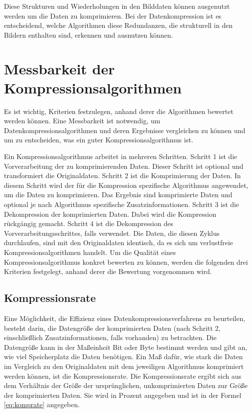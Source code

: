 \documentclass[conference]{IEEEtran}
\begin{document}
Diese Strukturen und Wiederholungen in den Bilddaten können ausgenutzt werden um die
Daten zu komprimieren.
Bei der Datenkompression ist es entscheidend, welche Algorithmen diese Redundanzen, 
die strukturell in den Bildern enthalten sind, erkennen und ausnutzen können.


\section{Messbarkeit der Kompressionsalgorithmen}

Es ist wichtig, Kriterien festzulegen, anhand derer die Algorithmen bewertet werden können.
Eine Messbarkeit ist notwendig, um Datenkompressionsalgorithmen und deren Ergebnisse
vergleichen zu können und um zu entscheiden, was ein guter Kompressionsalgorithmus ist.

Ein Kompressionsalgorithmus arbeitet in mehreren Schritten. 
Schritt 1 ist die Vorverarbeitung der zu komprimierenden Daten. 
Dieser Schritt ist optional und transformiert die Originaldaten. 
Schritt 2 ist die Komprimierung der Daten. 
In diesem Schritt wird der für die Kompression spezifische Algorithmus angewendet,
um die Daten zu komprimieren.
Das Ergebnis sind komprimierte Daten und optional je nach Algorithmus spezifische 
Zusatzinformationen. 
Schritt 3 ist die Dekompression der komprimierten Daten. 
Dabei wird die Kompression rückgängig gemacht. 
Schritt 4 ist die Dekompression des Vorverarbeitungsschrittes, falls verwendet. 
Die Daten, die diesen Zyklus durchlaufen, sind mit den Originaldaten identisch, da 
es sich um verlustfreie Kompressionsalgorithmen handelt. 
Um die Qualität eines Kompressionsalgorithmus konkret bewerten zu können, werden 
die folgenden drei Kriterien festgelegt, anhand derer die Bewertung vorgenommen wird.


\subsection{Kompressionsrate}

Eine Möglichkeit, die Effizienz eines Datenkompressionsverfahrens zu beurteilen, 
besteht darin, die Datengröße der komprimierten Daten (nach Schritt 2, einschließlich 
Zusatzinformationen, falls vorhanden) zu betrachten. 
Die Datengröße kann in der Maßeinheit Bit oder Byte bestimmt werden und gibt an, wie 
viel Speicherplatz die Daten benötigen. 
Ein Maß dafür, wie stark die Daten im Vergleich zu den Originaldaten mit dem 
jeweiligen Algorithmus komprimiert werden können, ist die Kompressionsrate. 
Die Kompressionsrate ergibt sich aus dem Verhältnis der Größe der ursprünglichen, 
unkomprimierten Daten zur Größe der komprimierten Daten.
Sie wird in Prozent angegeben und ist in der Formel \ref{eq:komprate} angegeben.
\end{document}
